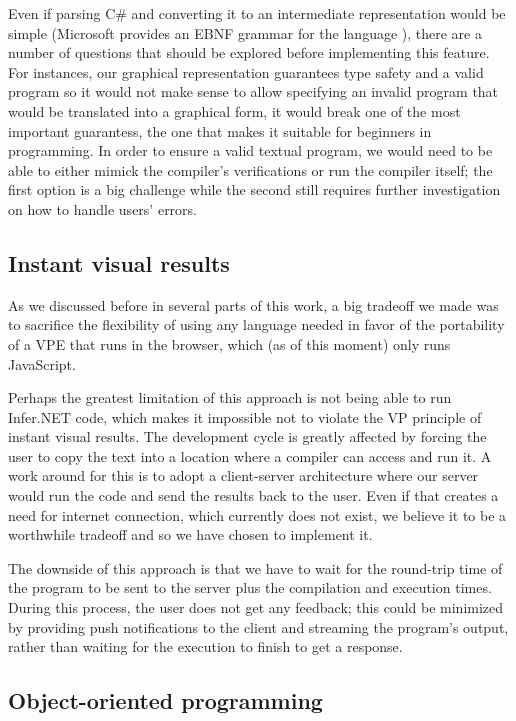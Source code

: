 Even if parsing C# and converting it to an intermediate representation would be
simple (Microsoft provides an EBNF grammar for the language \cite{ebnfcs}), there
are a number of questions that should be explored before implementing this feature.
For instances, our graphical representation guarantees type safety and a valid
program so it would not make sense to allow specifying an invalid program that
would be translated into a graphical form, it would break one of the most important
guarantess, the one that makes it suitable for beginners in programming. In
order to ensure a valid textual program, we would need to be able to either mimick
the compiler's verifications or run the compiler itself; the first option is
a big challenge while the second still requires further investigation on how
to handle users' errors.

\subsection{Instant visual results}

As we discussed before in several parts of this work, a big tradeoff we made was
to sacrifice the flexibility of using any language needed in favor of the portability
of a VPE that runs in the browser, which (as of this moment) only runs JavaScript.

Perhaps the greatest limitation of this approach is not being able to run Infer.NET
code, which makes it impossible not to violate the VP principle of instant visual results.
The development cycle is greatly affected by forcing the user to copy the text
into a location where a compiler can access and run it. A work around for this
is to adopt a client-server architecture where our server would run the code
and send the results back to the user. Even if that creates a need for internet
connection, which currently does not exist, we believe it to be a worthwhile tradeoff
and so we have chosen to implement it.

The downside of this approach is that we have to wait for the round-trip time
of the program to be sent to the server plus the compilation and execution times.
During this process, the user does not get any feedback; this could be minimized
by providing push notifications to the client and streaming the program's output,
rather than waiting for the execution to finish to get a response.

\subsection{Object-oriented programming}


